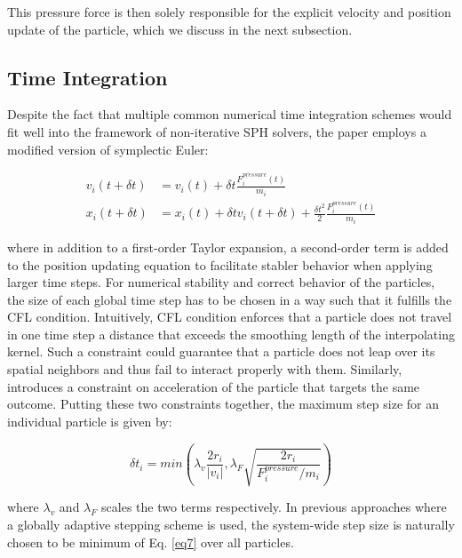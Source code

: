 \documentclass[
	11pt, 
	DIV10,
	ngerman,
	a4paper, 
	oneside, 
	headings=normal, 
	captions=tableheading,
	final, 
	numbers=noenddot
]{scrartcl}
\begin{document}
This pressure force is then solely responsible for the explicit velocity and position update of the particle, which we discuss in the next subsection.

\subsection{Time Integration}

Despite the fact that multiple common numerical time integration schemes would fit well into the framework of non-iterative SPH solvers, the paper employs a modified version of symplectic Euler:

\begin{equation}
\begin{split}
	\label{eq6}
	v_{i}(t + \delta t) &= v_{i}(t) + \delta t\frac{F_{i}^{pressure}(t)}{m_{i}} \\
	x_{i}(t + \delta t) &= x_{i}(t) + \delta t v_{i}(t + \delta t) + \frac{\delta t^{2}}{2}\frac{F_{i}^{pressure}(t)}{m_{i}}
\end{split}
\end{equation}

where in addition to a first-order Taylor expansion, a second-order term is added to the position updating equation to facilitate stabler behavior when applying larger time steps. For numerical stability and correct behavior of the particles, the size of each global time step has to be chosen in a way such that it fulfills the CFL condition. Intuitively, CFL condition enforces that a particle does not travel in one time step a distance that exceeds the smoothing length of the interpolating kernel. Such a constraint could guarantee that a particle does not leap over its spatial neighbors and thus fail to interact properly with them. Similarly, \cite{bender2010boundary} introduces a constraint on acceleration of the particle that targets the same outcome. Putting these two constraints together, the maximum step size for an individual particle is given by:

\begin{equation}
	\label{eq7}
	\delta t_{i} = min(\lambda_{v}\frac{2r_{i}}{|v_{i}|}, \lambda_{F}\sqrt{\frac{2r_{i}}{F_{i}^{pressure}/m_{i}}})
\end{equation}

where $ \lambda_{v} $ and $ \lambda_{F} $ scales the two terms respectively. In previous approaches where a globally adaptive stepping scheme is used, the system-wide step size is naturally chosen to be minimum of Eq. \eqref{eq7} over all particles.
\end{document}
